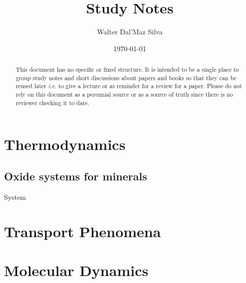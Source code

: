 \documentclass[12pt]{paper}
\title{Study Notes}
\author{Walter Dal'Maz Silva}
\date{\today}
\newcommand{\newSection}[1]{\cleardoublepage\section{#1}}
\begin{document}
\maketitle%

\begin{abstract}
	This document has no specific or fixed structure. It is intended to be a single place to group study notes and short discussions about papers and books so that they can be reused later \emph{i.e.} to give a lecture or as reminder for a review for a paper. Please do not rely on this document as a perennial source or as a source of truth since there is no reviewer checking it to date.
\end{abstract}

\cleardoublepage\tableofcontents%

\newSection{Thermodynamics}

\subsection{Oxide systems for minerals}

System ~\textcite{Huang1995}

\newSection{Transport Phenomena}



\newSection{Molecular Dynamics}

\newpage%
\printbibliography%
\end{document}
